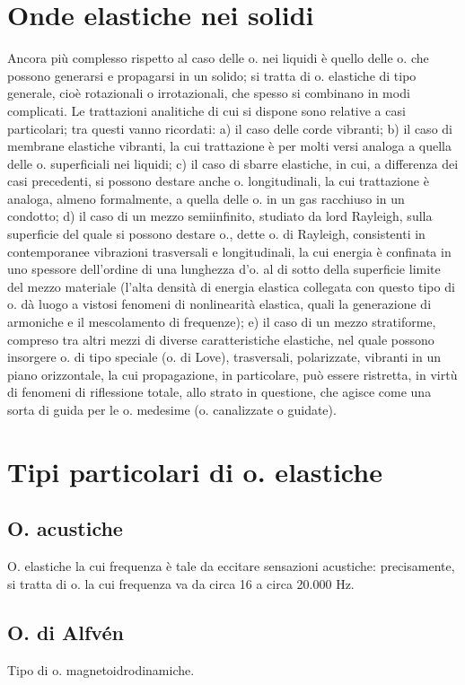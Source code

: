\documentclass[a4paper]{article}
\begin{document}
\section{Onde elastiche nei solidi}
Ancora più complesso rispetto al caso delle o. nei liquidi è quello delle o. che possono generarsi e propagarsi in un solido; si tratta di o. elastiche di tipo generale, cioè rotazionali o irrotazionali, che spesso si combinano in modi complicati. Le trattazioni analitiche di cui si dispone sono relative a casi particolari; tra questi vanno ricordati: a) il caso delle corde vibranti; b) il caso di membrane elastiche vibranti, la cui trattazione è per molti versi analoga a quella delle o. superficiali nei liquidi; c) il caso di sbarre elastiche, in cui, a differenza dei casi precedenti, si possono destare anche o. longitudinali, la cui trattazione è analoga, almeno formalmente, a quella delle o. in un gas racchiuso in un condotto; d) il caso di un mezzo semiinfinito, studiato da lord Rayleigh, sulla superficie del quale si possono destare o., dette o. di Rayleigh, consistenti in contemporanee vibrazioni trasversali e longitudinali, la cui energia è confinata in uno spessore dell'ordine di una lunghezza d'o. al di sotto della superficie limite del mezzo materiale (l'alta densità di energia elastica collegata con questo tipo di o. dà luogo a vistosi fenomeni di nonlinearità elastica, quali la generazione di armoniche e il mescolamento di frequenze); e) il caso di un mezzo stratiforme, compreso tra altri mezzi di diverse caratteristiche elastiche, nel quale possono insorgere o. di tipo speciale (o. di Love), trasversali, polarizzate, vibranti in un piano orizzontale, la cui propagazione, in particolare, può essere ristretta, in virtù di fenomeni di riflessione totale, allo strato in questione, che agisce come una sorta di guida per le o. medesime (o. canalizzate o guidate). 

\section{Tipi particolari di o. elastiche}

\subsection{O. acustiche}
O. elastiche la cui frequenza è tale da eccitare sensazioni acustiche: precisamente, si tratta di o. la cui frequenza va da circa 16 a circa 20.000 Hz. 

\subsection{O. di Alfvén} 
Tipo di o. magnetoidrodinamiche. 
\end{document}
